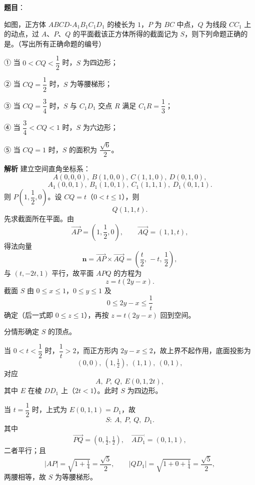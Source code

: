 \begin{answer}

\textbf{题目}：

如图，正方体 $ABCD\text{-}A_1B_1C_1D_1$ 的棱长为 $1$，$P$ 为 $BC$ 中点，$Q$ 为线段 $CC_1$ 上的动点，过 $A$、$P$、$Q$ 的平面截该正方体所得的截面记为 $S$，则下列命题正确的是\gkblank{}。（写出所有正确命题的编号）
\nopagebreak[4]
\begin{center}\end{center}
\nopagebreak[4]
\noindent ① 当 $0<CQ<\dfrac12$ 时，$S$ 为四边形；

\noindent ② 当 $CQ=\dfrac12$ 时，$S$ 为等腰梯形；

\noindent ③ 当 $CQ=\dfrac34$ 时，$S$ 与 $C_1D_1$ 交点 $R$ 满足 $C_1R=\dfrac13$；

\noindent ④ 当 $\dfrac34<CQ<1$ 时，$S$ 为六边形；

\noindent ⑤ 当 $CQ=1$ 时，$S$ 的面积为 $\dfrac{\sqrt6}2$。

\textbf{解析}
建立空间直角坐标系：
\nopagebreak[4]
\[A(0,0,0),\ B(1,0,0),\ C(1,1,0),\ D(0,1,0),\]
\nopagebreak[4]
\[A_1(0,0,1),\ B_1(1,0,1),\ C_1(1,1,1),\ D_1(0,1,1).\]
则 $P\left(1,\dfrac12,0\right)$。设 $CQ=t$（$0<t\leqslant1$），则
\nopagebreak[4]
\[Q(1,1,t).\]
先求截面所在平面。由
\nopagebreak[4]
\[\overrightarrow{AP}=\left(1,\frac12,0\right),\qquad \overrightarrow{AQ}=(1,1,t),\]
得法向量
\nopagebreak[4]
\[\boldsymbol n=\overrightarrow{AP}\times\overrightarrow{AQ}
=\left(\frac t2,\,-t,\,\frac12\right),\]
与 $(t,-2t,1)$ 平行，故平面 $APQ$ 的方程为
\nopagebreak[4]
\[z=t(2y-x).\]
截面 $S$ 由 $0\leqslant x\leqslant1$，$0\leqslant y\leqslant1$ 及
\nopagebreak[4]
\[0\leqslant 2y-x\leqslant\frac1t\]
确定（后一式即 $0\leqslant z\leqslant1$），再按 $z=t(2y-x)$ 回到空间。

分情形确定 $S$ 的顶点。

当 $0<t<\dfrac12$ 时，$\dfrac1t>2$，而正方形内 $2y-x\leqslant2$，故上界不起作用，底面投影为
\nopagebreak[4]
\[(0,0),\ \left(1,\tfrac12\right),\ (1,1),\ (0,1),\]
对应
\nopagebreak[4]
\[A,\ P,\ Q,\ E\left(0,1,2t\right),\]
其中 $E$ 在棱 $DD_1$ 上（$2t<1$）。此时 $S$ 为四边形。

当 $t=\dfrac12$ 时，上式为 $E\left(0,1,1\right)=D_1$，故
\nopagebreak[4]
\[S:\ A,\ P,\ Q,\ D_1.\]
其中
\nopagebreak[4]
\[\overrightarrow{PQ}=\left(0,\tfrac12,\tfrac12\right),\quad
\overrightarrow{AD_1}=(0,1,1),\]
二者平行；且
\nopagebreak[4]
\[|AP|=\sqrt{1+\tfrac14}=\frac{\sqrt5}2,\qquad
|QD_1|=\sqrt{1+0+\tfrac14}=\frac{\sqrt5}2,\]
两腰相等，故 $S$ 为等腰梯形。


\end{answer}
